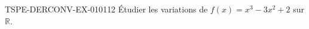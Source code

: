 \begin{exercice}{TSPE-DERCONV-EX-010}{1}{12}
Étudier les variations de $f(x) = x^3 - 3x^2 + 2$ sur $\mathbb{R}$.

\end{exercice}
